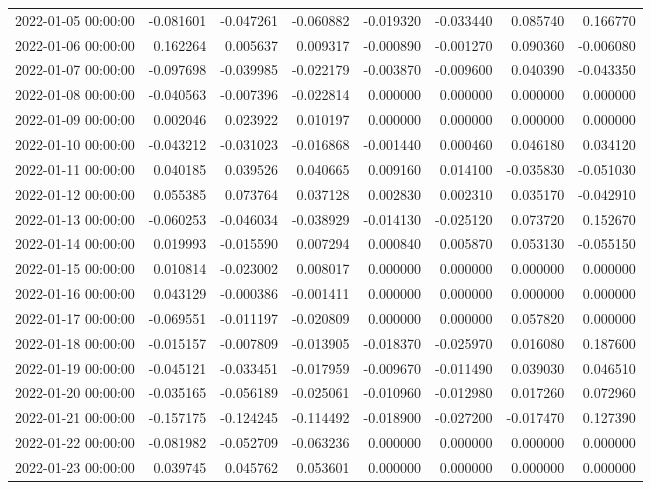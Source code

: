 \begin{tabular}{lrrrrrrr}
2022-01-05 00:00:00 & -0.081601 & -0.047261 & -0.060882 & -0.019320 & -0.033440 & 0.085740 & 0.166770 \\
2022-01-06 00:00:00 & 0.162264 & 0.005637 & 0.009317 & -0.000890 & -0.001270 & 0.090360 & -0.006080 \\
2022-01-07 00:00:00 & -0.097698 & -0.039985 & -0.022179 & -0.003870 & -0.009600 & 0.040390 & -0.043350 \\
2022-01-08 00:00:00 & -0.040563 & -0.007396 & -0.022814 & 0.000000 & 0.000000 & 0.000000 & 0.000000 \\
2022-01-09 00:00:00 & 0.002046 & 0.023922 & 0.010197 & 0.000000 & 0.000000 & 0.000000 & 0.000000 \\
2022-01-10 00:00:00 & -0.043212 & -0.031023 & -0.016868 & -0.001440 & 0.000460 & 0.046180 & 0.034120 \\
2022-01-11 00:00:00 & 0.040185 & 0.039526 & 0.040665 & 0.009160 & 0.014100 & -0.035830 & -0.051030 \\
2022-01-12 00:00:00 & 0.055385 & 0.073764 & 0.037128 & 0.002830 & 0.002310 & 0.035170 & -0.042910 \\
2022-01-13 00:00:00 & -0.060253 & -0.046034 & -0.038929 & -0.014130 & -0.025120 & 0.073720 & 0.152670 \\
2022-01-14 00:00:00 & 0.019993 & -0.015590 & 0.007294 & 0.000840 & 0.005870 & 0.053130 & -0.055150 \\
2022-01-15 00:00:00 & 0.010814 & -0.023002 & 0.008017 & 0.000000 & 0.000000 & 0.000000 & 0.000000 \\
2022-01-16 00:00:00 & 0.043129 & -0.000386 & -0.001411 & 0.000000 & 0.000000 & 0.000000 & 0.000000 \\
2022-01-17 00:00:00 & -0.069551 & -0.011197 & -0.020809 & 0.000000 & 0.000000 & 0.057820 & 0.000000 \\
2022-01-18 00:00:00 & -0.015157 & -0.007809 & -0.013905 & -0.018370 & -0.025970 & 0.016080 & 0.187600 \\
2022-01-19 00:00:00 & -0.045121 & -0.033451 & -0.017959 & -0.009670 & -0.011490 & 0.039030 & 0.046510 \\
2022-01-20 00:00:00 & -0.035165 & -0.056189 & -0.025061 & -0.010960 & -0.012980 & 0.017260 & 0.072960 \\
2022-01-21 00:00:00 & -0.157175 & -0.124245 & -0.114492 & -0.018900 & -0.027200 & -0.017470 & 0.127390 \\
2022-01-22 00:00:00 & -0.081982 & -0.052709 & -0.063236 & 0.000000 & 0.000000 & 0.000000 & 0.000000 \\
2022-01-23 00:00:00 & 0.039745 & 0.045762 & 0.053601 & 0.000000 & 0.000000 & 0.000000 & 0.000000 \\

\end{tabular}
